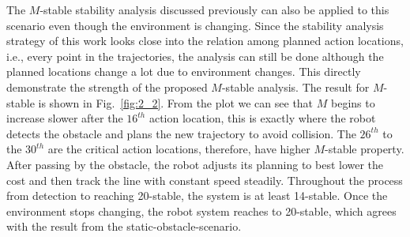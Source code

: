 \documentclass{ifacconf}
\begin{document}
The $M$-stable stability analysis discussed previously can also be applied to this scenario even though the environment is changing. Since the stability analysis strategy of this work looks close into the relation among planned action locations, i.e., every point in the trajectories, the analysis can still be done although the planned locations change a lot due to environment changes. This directly demonstrate the strength of the proposed $M$-stable analysis. The result for $M$-stable is shown in Fig.~\ref{fig:2_2}. From the plot we can see that $M$ begins to increase slower after the $16^{th}$ action location, this is exactly where the robot detects the obstacle and plans the new trajectory to avoid collision. The $26^{th}$ to the $30^{th}$ are the critical action locations, therefore, have higher $M$-stable property. After passing by the obstacle, the robot adjusts its planning to best lower the cost and then track the line with constant speed steadily. Throughout the process from detection to reaching 20-stable, the system is at least 14-stable. Once the environment stops changing, the robot system reaches to 20-stable, which agrees with the result from the static-obstacle-scenario.     
\end{document}
